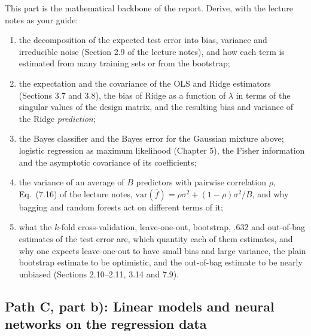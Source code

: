 \documentclass[11pt,a4paper]{article}
\begin{document}
This part is the mathematical backbone of the report.  Derive, with the
lecture notes as your guide:
\begin{enumerate}[nosep]
  \item the decomposition of the expected test error into bias, variance and
        irreducible noise (Section 2.9 of the lecture notes), and how each
        term is estimated from many training sets or from the bootstrap;
  \item the expectation and the covariance of the OLS and Ridge estimators
        (Sections 3.7 and 3.8), the bias of Ridge as a function of $\lambda$
        in terms of the singular values of the design matrix, and the
        resulting bias and variance of the Ridge \emph{prediction};
  \item the Bayes classifier and the Bayes error for the Gaussian mixture
        above; logistic regression as maximum likelihood (Chapter 5), the
        Fisher information and the asymptotic covariance of its coefficients;
  \item the variance of an average of $B$ predictors with pairwise
        correlation $\rho$, Eq.\ (7.16) of the lecture notes,
        $\mathrm{var}(\bar f)=\rho\sigma^2+(1-\rho)\sigma^2/B$, and why
        bagging and random forests act on different terms of it;
  \item what the $k$-fold cross-validation, leave-one-out, bootstrap, .632
        and out-of-bag estimates of the test error are, which quantity each
        of them estimates, and why one expects leave-one-out to have small
        bias and large variance, the plain bootstrap estimate to be
        optimistic, and the out-of-bag estimate to be nearly unbiased
        (Sections 2.10--2.11, 3.14 and 7.9).
\end{enumerate}

\subsection*{Path C, part b): Linear models and neural networks on the regression data}
\end{document}
